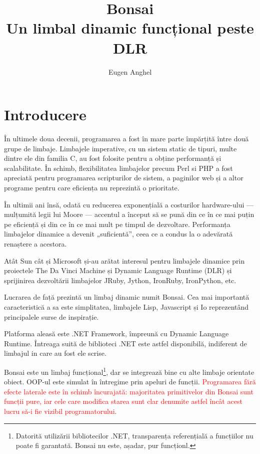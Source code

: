 \documentclass[12pt,a4paper]{memoir}
\title{Bonsai\\Un limbal dinamic funcțional peste DLR}
\author{Eugen Anghel}
\begin{document}
\newcommand{\draft}{\textcolor{red}}

\renewcommand{\thefootnote}{\fnsymbol{footnote}}

\maketitle

\newpage
\tableofcontents

\chapter*{Introducere}

În ultimele doua decenii, programarea a fost în mare parte împărțită între două grupe de limbaje. Limbajele imperative, cu un sistem static de tipuri, multe dintre ele din familia C, au fost folosite pentru a obține performanță și scalabilitate. În schimb, flexibilitatea limbajelor precum Perl si PHP a fost apreciată pentru programarea scripturilor de sistem, a paginilor web și a altor programe pentru care eficiența nu reprezintă o prioritate.

În ultimii ani însă, odată cu reducerea exponențială a costurilor hardware-ului — mulțumită legii lui Moore — accentul a început să se pună din ce în ce mai puțin pe eficiență și din ce în ce mai mult pe timpul de dezvoltare. Performanța limbajelor dinamice a devenit „suficientă”, ceea ce a condus la o adevărată renaștere a acestora.

Atât Sun cât și Microsoft și-au arătat interesul pentru limbajele dinamice prin proiectele The Da Vinci Machine\cite{daVinciMachine} și Dynamic Language Runtime (DLR)\cite{dlr} și sprijinirea dezvoltării limbajelor JRuby\cite{jruby}, Jython\cite{jython}, IronRuby\cite{ironruby}, IronPython\cite{ironpython}, etc.

Lucrarea de față prezintă un limbaj dinamic numit Bonsai. Cea mai importantă caracteristică a sa este simplitatea, limbajele Lisp, Javascript și Io \cite{io} reprezentând principalele surse de inspirație.

Platforma aleasă este .NET Framework, împreună cu Dynamic Language Runtime. Întreaga suită de biblioteci .NET este astfel disponibilă, indiferent de limbajul in care au fost ele scrise. 

Bonsai este un limbaj funcțional\footnote{Datorită utilizării bibliotecilor .NET, transparența referențială a funcțiilor nu poate fi garantată. Bonsai nu este, așadar, pur funcționl.}, dar se integrează bine cu alte limbaje orientate obiect. OOP-ul este simulat în întregime prin apeluri de funcții. \draft{Programarea fără efecte laterale este în schimb încurajată: majoritatea primitivelor din Bonsai sunt funcții pure, iar cele care modifica starea sunt clar denumite astfel încât acest lucru să-i fie vizibil programatorului}.
\end{document}
